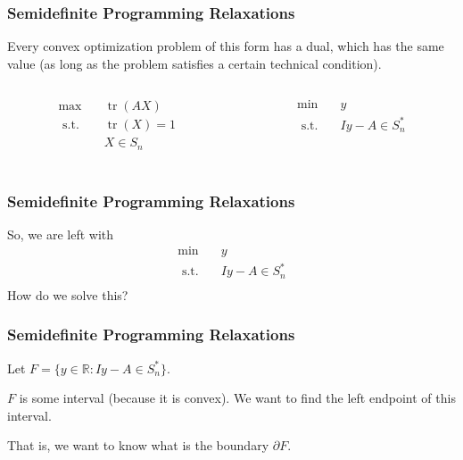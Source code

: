 \documentclass{beamer}
\newcommand{\R}{\mathbb{R}}
\DeclareMathOperator{\tr}{tr}
\newcommand{\st}{{\text{ s.t. }}}
\begin{document}
\begin{frame}
\frametitle{Semidefinite Programming Relaxations}
    Every convex optimization problem of this form has a dual, which has the same value (as long as the problem satisfies a certain technical condition).
    \hspace{0.3in}
    \begin{columns}
        \begin{column}{0.5\textwidth}
            \begin{equation*}
                \begin{aligned}
                    \max\quad & \tr(AX)\\
                    \st & \tr(X) = 1\\
                        & X \in S_n\\
                \end{aligned}
            \end{equation*}
        \end{column}
        \begin{column}{0.5\textwidth}
            \begin{equation*}
                \begin{aligned}
                    \min\quad & y\\
                    \st & Iy - A \in S_n^*\\
                \end{aligned}
            \end{equation*}
        \end{column}
    \end{columns}
\end{frame}
\begin{frame}
\frametitle{Semidefinite Programming Relaxations}
    So, we are left with
    \begin{equation*}
        \begin{aligned}
            \min\quad & y\\
            \st & Iy - A \in S_n^*\\
        \end{aligned}
    \end{equation*}
    How do we solve this?
\end{frame}
\begin{frame}
\frametitle{Semidefinite Programming Relaxations}
    Let $F = \{y \in \R : Iy - A \in S_n^*\}$.
    \pause

    $F$ is some interval (because it is convex). We want to find the left endpoint of this interval.

    That is, we want to know what is the boundary $\partial F$. 
\end{frame}
\end{document}
